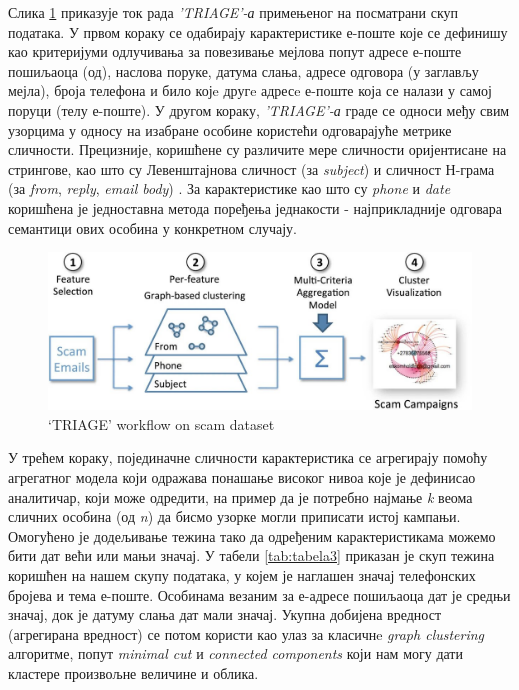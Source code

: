 \documentclass[a4paper]{article}
\begin{document}
Слика \ref{fig:slika2} приказује ток рада \emph{'TRIAGE'-а} примењеног на посматрани скуп података. У првом кораку се одабирају карактеристике е-поште које се дефинишу као критеријуми одлучивања за повезивање мејлова попут адресе е-поште пошиљаоца (од), наслова поруке, датума слања, адресе одговора (у заглављу мејла), броја телефона и било којe другe адресe е-поште која се налази у самој поруци (телу е-поште). У другом кораку, \emph{'TRIAGE'-а} граде се односи међу свим узорцима у односу на изабране особине користећи одговарајуће метрике сличности. Прецизније, коришћене су различите мере сличности оријентисане на стрингове, као што су Левенштајнова сличност (за \emph{subject}) и сличност Н-грама (за \emph{from}, \emph{reply}, \emph{email body}) \cite{ngram}. За карактеристике као што су \emph{phone} и \emph{date} коришћена је једноставна метода поређења једнакости - најприкладније одговара семантици ових особина у конкретном случају.

\begin{figure}[h!]
\begin{center}
\includegraphics[scale=0.2]{slike/3.jpg}
\end{center}
\caption{‘TRIAGE’ workflow on scam dataset}
\label{fig:slika2}
\end{figure}

У трећем кораку, појединачне сличности карактеристика се агрегирају помоћу агрегатног модела који одражава понашање високог нивоа које је дефинисао аналитичар, који може одредити, на пример да је потребно најмање \emph{k} веома сличних особина (од \emph{n}) да бисмо узорке могли приписати истој кампањи. Омогућено је додељивање тежина тако да одређеним карактеристикама можемо бити дат већи или мањи значај. У табели \ref{tab:tabela3} приказан је скуп тежина коришћен на нашем скупу података, у којем је наглашен значај телефонских бројева и тема е-поште. Особинама везаним за е-адресе пошиљаоца дат је средњи значај, док је датуму слања дат мали значај. Укупна добијена вредност (агрегирана вредност) се потом користи као улаз за класичнe \emph{graph clustering} алгоритме, попут \emph{minimal cut} и \emph{connected components} који нам могу дати кластере произвољне величине и облика.
\end{document}
